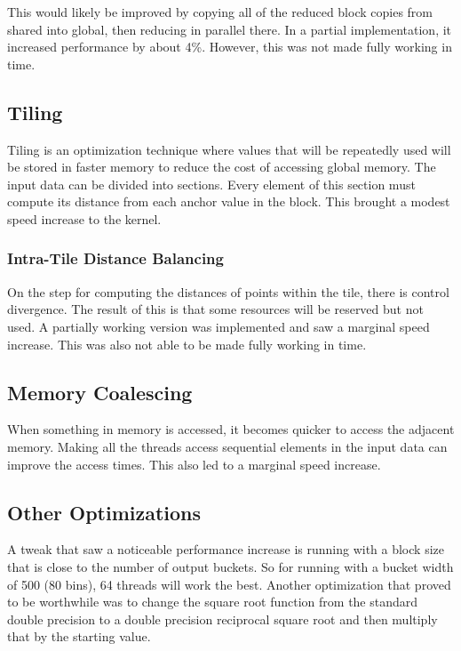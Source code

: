 This would likely be improved by copying all of the reduced block copies from shared into global, then reducing in parallel there. In a partial implementation, it increased performance by about 4\%. However, this was not made fully working in time.


\subsection{Tiling}
\hspace{\parindent}Tiling is an optimization technique where values that will be repeatedly used will be stored in faster memory to reduce the cost of accessing global memory. The input data can be divided into sections. Every element of this section must compute its distance from each anchor value in the block. This brought a modest speed increase to the kernel.

\subsubsection{Intra-Tile Distance Balancing}
\hspace{\parindent}On the step for computing the distances of points within the tile, there is control divergence. The result of this is that some resources will be reserved but not used. A partially working version was implemented and saw a marginal speed increase. This was also not able to be made fully working in time.

\subsection{Memory Coalescing}
\hspace{\parindent}When something in memory is accessed, it becomes quicker to access the adjacent memory. Making all the threads access sequential elements in the input data can improve the access times. This also led to a marginal speed increase. 

\subsection{Other Optimizations}
\hspace{\parindent}A tweak that saw a noticeable performance increase is running with a block size that is close to the number of output buckets. So for running with a bucket width of 500 (80 bins), 64 threads will work the best. Another optimization that proved to be worthwhile was to change the square root function from the standard double precision to a double precision reciprocal square root and then multiply that by the starting value. 
